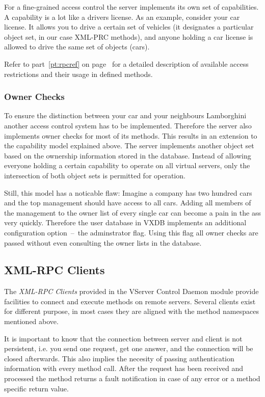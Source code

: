 For a fine-grained access control the server implements its own set of
capabilities.  A capability is a lot like a drivers license. As an example,
consider your car license. It allows you to drive a certain set of vehicles (it
designates a particular object set, in our case XML-PRC methods), and anyone
holding a car license is allowed to drive the same set of objects (cars).

Refer to part~\ref{pt:rpcref} on page~\pageref{pt:rpcref} for a detailed
description of available access restrictions and their usage in defined
methods.

\subsubsection{Owner Checks}

To ensure the distinction between your car and your neighbours Lamborghini
another access control system has to be implemented. Therefore the server also
implements owner checks for most of its methods. This results in an extension
to the capability model explained above. The server implements another object
set based on the ownership information stored in the database. Instead of
allowing everyone holding a certain capability to operate on all virtual
servers, only the intersection of both object sets is permitted for operation.

Still, this model has a noticable flaw: Imagine a company has two hundred cars
and the top management should have access to all cars. Adding all members of
the management to the owner list of every single car can become a pain in the
ass very quickly. Therefore the user database in VXDB implements an additional
configuration option~--~the adminstrator flag. Using this flag all owner checks
are passed without even consulting the owner lists in the database.


\subsection{XML-RPC Clients}

The \emph{XML-RPC Clients} provided in the VServer Control Daemon module
provide facilities to connect and execute methods on remote servers. Several
clients exist for different purpose, in most cases they are aligned with the
method namespaces mentioned above.

It is important to know that the connection between server and client is not
persistent, i.e. you send one request, get one answer, and the connection will
be closed afterwards. This also implies the necesity of passing authentication
information with every method call. After the request has been received and
processed the method returns a fault notification in case of any error or a
method specific return value.

